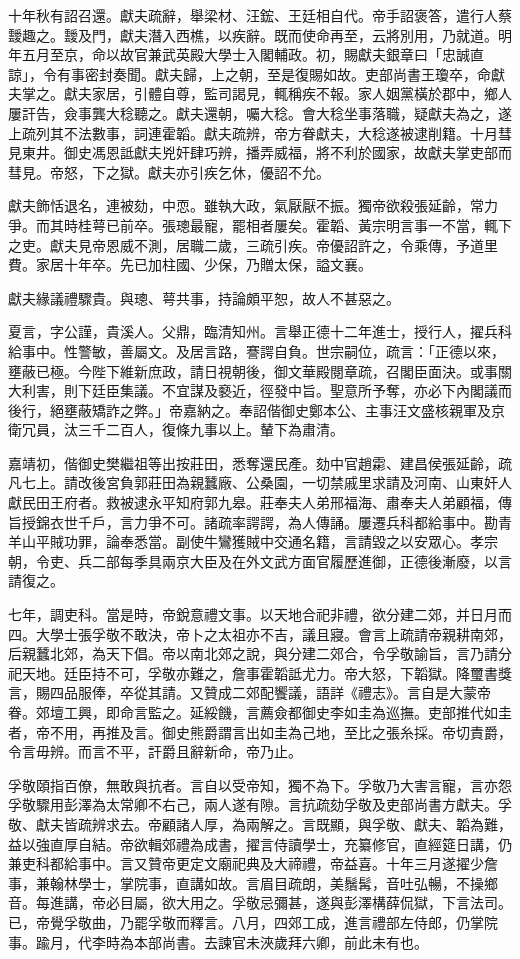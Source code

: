 \begin{pinyinscope}
十年秋有詔召還。獻夫疏辭，舉梁材、汪鋐、王廷相自代。帝手詔褒答，遣行人蔡靉趣之。靉及門，獻夫潛入西樵，以疾辭。既而使命再至，云將別用，乃就道。明年五月至京，命以故官兼武英殿大學士入閣輔政。初，賜獻夫銀章曰「忠誠直諒」，令有事密封奏聞。獻夫歸，上之朝，至是復賜如故。吏部尚書王瓊卒，命獻夫掌之。獻夫家居，引體自尊，監司謁見，輒稱疾不報。家人姻黨橫於郡中，鄉人屢訐告，僉事龔大稔聽之。獻夫還朝，囑大稔。會大稔坐事落職，疑獻夫為之，遂上疏列其不法數事，詞連霍韜。獻夫疏辨，帝方眷獻夫，大稔遂被逮削籍。十月彗見東井。御史馮恩詆獻夫兇奸肆巧辨，播弄威福，將不利於國家，故獻夫掌吏部而彗見。帝怒，下之獄。獻夫亦引疾乞休，優詔不允。

獻夫飾恬退名，連被劾，中恧。雖執大政，氣厭厭不振。獨帝欲殺張延齡，常力爭。而其時桂萼已前卒。張璁最寵，罷相者屢矣。霍韜、黃宗明言事一不當，輒下之吏。獻夫見帝恩威不測，居職二歲，三疏引疾。帝優詔許之，令乘傳，予道里費。家居十年卒。先已加柱國、少保，乃贈太保，謚文襄。

獻夫緣議禮驟貴。與璁、萼共事，持論頗平恕，故人不甚惡之。

夏言，字公謹，貴溪人。父鼎，臨清知州。言舉正德十二年進士，授行人，擢兵科給事中。性警敏，善屬文。及居言路，謇諤自負。世宗嗣位，疏言：「正德以來，壅蔽已極。今陛下維新庶政，請日視朝後，御文華殿閱章疏，召閣臣面決。或事關大利害，則下廷臣集議。不宜謀及褻近，徑發中旨。聖意所予奪，亦必下內閣議而後行，絕壅蔽矯詐之弊。」帝嘉納之。奉詔偕御史鄭本公、主事汪文盛核親軍及京衛冗員，汰三千二百人，復條九事以上。輦下為肅清。

嘉靖初，偕御史樊繼祖等出按莊田，悉奪還民產。劾中官趙霦、建昌侯張延齡，疏凡七上。請改後宮負郭莊田為親蠶廠、公桑園，一切禁戚里求請及河南、山東奸人獻民田王府者。救被逮永平知府郭九皋。莊奉夫人弟邢福海、肅奉夫人弟顧福，傳旨授錦衣世千戶，言力爭不可。諸疏率諤諤，為人傳誦。屢遷兵科都給事中。勘青羊山平賊功罪，論奉悉當。副使牛鸞獲賊中交通名籍，言請毀之以安眾心。孝宗朝，令吏、兵二部每季具兩京大臣及在外文武方面官履歷進御，正德後漸廢，以言請復之。

七年，調吏科。當是時，帝銳意禮文事。以天地合祀非禮，欲分建二郊，并日月而四。大學士張孚敬不敢決，帝卜之太祖亦不吉，議且寢。會言上疏請帝親耕南郊，后親蠶北郊，為天下倡。帝以南北郊之說，與分建二郊合，令孚敬諭旨，言乃請分祀天地。廷臣持不可，孚敬亦難之，詹事霍韜詆尤力。帝大怒，下韜獄。降璽書獎言，賜四品服俸，卒從其請。又贊成二郊配饗議，語詳《禮志》。言自是大蒙帝眷。郊壇工興，即命言監之。延綏饑，言薦僉都御史李如圭為巡撫。吏部推代如圭者，帝不用，再推及言。御史熊爵謂言出如圭為己地，至比之張糸採。帝切責爵，令言毋辨。而言不平，訐爵且辭新命，帝乃止。

孚敬頤指百僚，無敢與抗者。言自以受帝知，獨不為下。孚敬乃大害言寵，言亦怨孚敬驟用彭澤為太常卿不右己，兩人遂有隙。言抗疏劾孚敬及吏部尚書方獻夫。孚敬、獻夫皆疏辨求去。帝顧諸人厚，為兩解之。言既顯，與孚敬、獻夫、韜為難，益以強直厚自結。帝欲輯郊禮為成書，擢言侍讀學士，充纂修官，直經筵日講，仍兼吏科都給事中。言又贊帝更定文廟祀典及大禘禮，帝益喜。十年三月遂擢少詹事，兼翰林學士，掌院事，直講如故。言眉目疏朗，美鬚髯，音吐弘暢，不操鄉音。每進講，帝必目屬，欲大用之。孚敬忌彌甚，遂與彭澤構薛侃獄，下言法司。已，帝覺孚敬曲，乃罷孚敬而釋言。八月，四郊工成，進言禮部左侍郎，仍掌院事。踰月，代李時為本部尚書。去諫官未浹歲拜六卿，前此未有也。


\end{pinyinscope}
